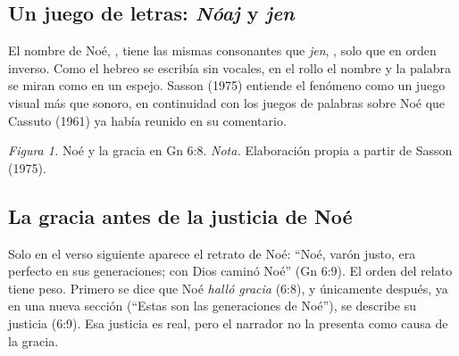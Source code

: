 \subsection{Un juego de letras: \emph{Nóaj} y \emph{jen}}
El nombre de Noé, , tiene las mismas consonantes que \emph{jen}, , solo que en orden inverso. Como el hebreo se escribía sin vocales, en el rollo el nombre y la palabra se miran como en un espejo. Sasson (1975) entiende el fenómeno como un juego visual más que sonoro, en continuidad con los juegos de palabras sobre Noé que Cassuto (1961) ya había reunido en su comentario.

\begin{center}
\par
{\footnotesize\color{gris}\textit{Figura 1.} Noé y la gracia en Gn 6:8. \textit{Nota.} Elaboración propia a partir de Sasson (1975).}
\end{center}


\subsection{La gracia antes de la justicia de Noé}
Solo en el verso siguiente aparece el retrato de Noé: ``Noé, varón justo, era perfecto en sus generaciones; con Dios caminó Noé'' (Gn 6:9). El orden del relato tiene peso. Primero se dice que Noé \emph{halló gracia} (6:8), y únicamente después, ya en una nueva sección (``Estas son las generaciones de Noé''), se describe su justicia (6:9). Esa justicia es real, pero el narrador no la presenta como causa de la gracia.

